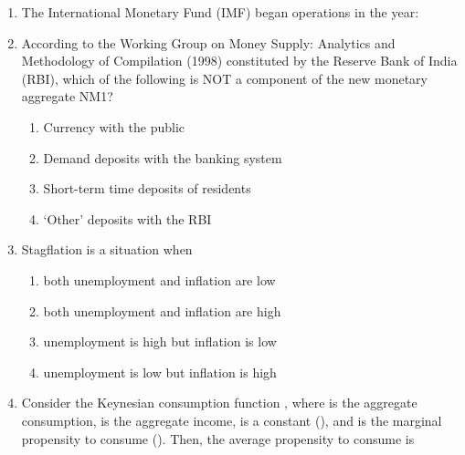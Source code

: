 \documentclass[12pt]{article}
\theoremstyle{remark}
\begin{document}
\begin{enumerate}
\begin{enumerate}
 \end{enumerate}
\hfill{}
\item   The International Monetary Fund (IMF) began operations in the year: 
\begin{enumerate}  \end{enumerate}
\hfill{}
\item   According to the Working Group on Money Supply: Analytics and Methodology of Compilation (1998) constituted by the Reserve Bank of India (RBI), which of the following is NOT a component of the new monetary aggregate NM1? 
\begin{enumerate}
\item   Currency with the public 
\item   Demand deposits with the banking system 
\item   Short-term time deposits of residents 
\item   ‘Other’ deposits with the RBI 
\end{enumerate}
\hfill{}
\item  Stagflation is a situation when 
\begin{enumerate} 
\item   both unemployment and inflation are low 
\item   both unemployment and inflation are high 
\item   unemployment is high but inflation is low 
\item   unemployment is low but inflation is high 
\end{enumerate}
\hfill{}
\item  Consider the Keynesian consumption function , where  is the aggregate consumption, \brak{ \gamma } is the aggregate income, \brak{ \alpha } is a constant (), and \brak{ \beta } is the marginal propensity to consume (). Then, the average propensity to consume is 

\end{enumerate}
\end{document}
